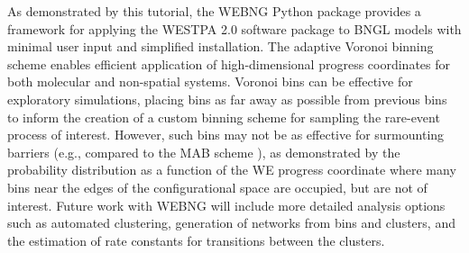 As demonstrated by this tutorial, the WEBNG Python package provides a framework for applying the WESTPA 2.0 software package to BNGL models with minimal user input and simplified installation. 
The adaptive Voronoi binning scheme enables efficient application of high-dimensional progress coordinates for both molecular and non-spatial systems.
Voronoi bins can be effective for exploratory simulations, placing bins as far away as possible from previous bins to inform the creation of a custom binning scheme for sampling the rare-event process of interest. 
However, such bins may not be as effective for surmounting barriers (e.g., compared to the MAB scheme \citep{torrillo_minimal_2021}), as demonstrated by the probability distribution as a function of the WE progress coordinate where many bins near the edges of the configurational space are occupied, but are not of interest. 
Future work with WEBNG will include more detailed analysis options such as automated clustering, generation of networks from bins and clusters, and the estimation of rate constants for transitions between the clusters. 
